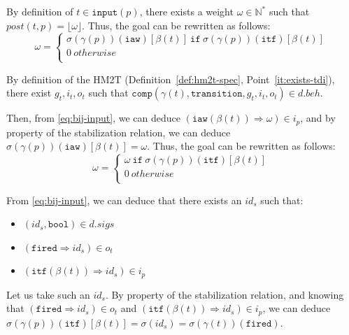 \begin{pf}
\begin{itemize}
\begin{enumerate}
      \noindent{}By definition of $t\in{}\mathtt{input}(p)$, there
      exists a weight $\omega\in\mathbb{N}^{*}$ such that
      $post(t,p)=\lfloor\omega\rfloor$.  Thus, the goal can be
      rewritten as follows:     
      \begin{equation*}
        \boxed{\omega=
          \begin{cases}
            \sigma(\gamma(p))(\texttt{iaw})[\beta(t)]~\mathtt{if}~\sigma(\gamma(p))(\texttt{itf})[\beta(t)]~ \\
            0~otherwise \\
          \end{cases}}
      \end{equation*}

     By definition of the HM2T (Definition~\ref{def:hm2t-spec},
     Point~\ref{it:exists-tdi}), there exist $g_t,i_t,o_t$ such that
     $\mathtt{comp}(\gamma(t),\mathtt{transition}, g_t, i_t,
     o_t)\in{}d.beh$. 
     
     Then, from \eqref{eq:bij-input}, we can deduce
     $(\mathtt{iaw}(\beta(t))\Rightarrow{}\omega)\in{}i_p$, and by
     property of the stabilization relation, we can deduce
     $\sigma(\gamma(p))(\texttt{iaw})[\beta(t)]=\omega$. Thus, the goal
     can be rewritten as follows:
     \begin{equation*}
       \boxed{\omega=
       \begin{cases}
         \omega~\mathtt{if}~\sigma(\gamma(p))(\texttt{itf})[\beta(t)]~ \\
         0~otherwise \\
       \end{cases}}
     \end{equation*}
     
     From \eqref{eq:bij-input}, we can deduce that there exists an
     $id_s$ such that:
     \begin{itemize}
     \item $(id_s,\mathtt{bool})\in{}d.sigs$
     \item $(\mathtt{fired}\Rightarrow{}id_s)\in{}o_t$
     \item $(\mathtt{itf}(\beta(t))\Rightarrow{}id_s)\in{}i_p$
     \end{itemize}
     
     Let us take such an $id_s$. By property of the stabilization
     relation, and knowing that
     $(\mathtt{fired}\Rightarrow{}id_s)\in{}o_t$ and
     $(\mathtt{itf}(\beta(t))\Rightarrow{}id_s)\in{}i_p$, we can deduce
     $\sigma(\gamma(p))(\texttt{itf})[\beta(t)]=\sigma(id_s)=\sigma(\gamma(t))(\texttt{fired})$.


\end{enumerate}
\end{itemize}
\end{pf}
